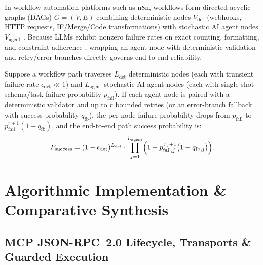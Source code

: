 \documentclass[../../../../master.tex]{subfiles}
\begin{document}
In workflow automation platforms such as n8n, workflows form directed acyclic graphs (DAGs) $G = (V, E)$ combining deterministic nodes $V_{\text{det}}$ (webhooks, HTTP requests, IF/Merge/Code transformations) with stochastic AI agent nodes $V_{\text{agent}}$ . Because LLMs exhibit nonzero failure rates on exact counting, formatting, and constraint adherence , wrapping an agent node with deterministic validation and retry/error branches directly governs end-to-end reliability.

\begin{coremath}
Suppose a workflow path traverses $L_{\text{det}}$ deterministic nodes (each with transient failure rate $\epsilon_{\text{det}} \ll 1$) and $L_{\text{agent}}$ stochastic AI agent nodes (each with single-shot schema/task failure probability $p_{\text{fail}}$). If each agent node is paired with a deterministic validator and up to $r$ bounded retries (or an error-branch fallback with success probability $q_{\text{fb}}$), the per-node failure probability drops from $p_{\text{fail}}$ to $p_{\text{fail}}^{r+1} (1 - q_{\text{fb}})$, and the end-to-end path success probability is:
\begin{equation}
  P_{\text{success}} = (1 - \epsilon_{\text{det}})^{L_{\text{det}}} \cdot \prod_{j=1}^{L_{\text{agent}}} \Bigl(1 - p_{\text{fail}, j}^{\,r_j + 1}\bigl(1 - q_{\text{fb}, j}\bigr)\Bigr).
  \label{eq:mcp:dag_reliability}
\end{equation}
\end{coremath}

\section{Algorithmic Implementation \& Comparative Synthesis}
\label{sec:mcp:algorithms}

\subsection{MCP JSON-RPC~2.0 Lifecycle, Transports \& Guarded Execution}
\end{document}
